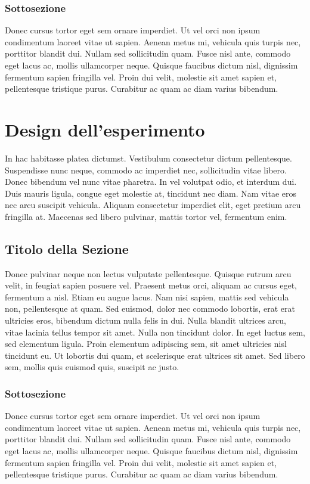 \documentclass[target=mst,aauheader=,style=]{thud}
\begin{document}
\subsection{Sottosezione}
Donec cursus tortor eget sem ornare imperdiet. Ut vel orci non ipsum condimentum laoreet vitae ut sapien. Aenean metus mi, vehicula quis turpis nec, porttitor blandit dui. Nullam sed sollicitudin quam. Fusce nisl ante, commodo eget lacus ac, mollis ullamcorper neque. Quisque faucibus dictum nisl, dignissim fermentum sapien fringilla vel. Proin dui velit, molestie sit amet sapien et, pellentesque tristique purus. Curabitur ac quam ac diam varius bibendum.

\chapter{Design dell'esperimento}
In hac habitasse platea dictumst. Vestibulum consectetur dictum pellentesque. Suspendisse nunc neque, commodo ac imperdiet nec, sollicitudin vitae libero. Donec bibendum vel nunc vitae pharetra. In vel volutpat odio, et interdum dui. Duis mauris ligula, congue eget molestie at, tincidunt nec diam. Nam vitae eros nec arcu suscipit vehicula. Aliquam consectetur imperdiet elit, eget pretium arcu fringilla at. Maecenas sed libero pulvinar, mattis tortor vel, fermentum enim.

\section{Titolo della Sezione}
Donec pulvinar neque non lectus vulputate pellentesque. Quisque rutrum arcu velit, in feugiat sapien posuere vel. Praesent metus orci, aliquam ac cursus eget, fermentum a nisl. Etiam eu augue lacus. Nam nisi sapien, mattis sed vehicula non, pellentesque at quam. Sed euismod, dolor nec commodo lobortis, erat erat ultricies eros, bibendum dictum nulla felis in dui. Nulla blandit ultrices arcu, vitae lacinia tellus tempor sit amet. Nulla non tincidunt dolor. In eget luctus sem, sed elementum ligula. Proin elementum adipiscing sem, sit amet ultricies nisl tincidunt eu. Ut lobortis dui quam, et scelerisque erat ultrices sit amet. Sed libero sem, mollis quis euismod quis, suscipit ac justo.

\subsection{Sottosezione}
Donec cursus tortor eget sem ornare imperdiet. Ut vel orci non ipsum condimentum laoreet vitae ut sapien. Aenean metus mi, vehicula quis turpis nec, porttitor blandit dui. Nullam sed sollicitudin quam. Fusce nisl ante, commodo eget lacus ac, mollis ullamcorper neque. Quisque faucibus dictum nisl, dignissim fermentum sapien fringilla vel. Proin dui velit, molestie sit amet sapien et, pellentesque tristique purus. Curabitur ac quam ac diam varius bibendum.
\end{document}
